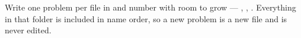 \begin{callout}
  Write one problem per file in  and number with room to grow --- , , .
  Everything in that folder is included in name order, so a new problem is a new file and  is never edited.
\end{callout}

